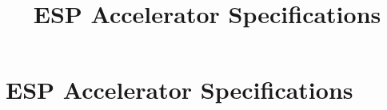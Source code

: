 \documentclass[oneside]{book}
\title{\huge \bf ESP Accelerator Specifications}
\begin{document}
\maketitle
\tableofcontents



\chapter{ESP Accelerator Specifications}




\end{document}
